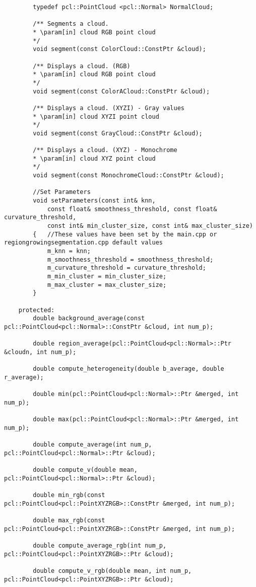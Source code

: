 \begin{lstlisting}
		typedef pcl::PointCloud <pcl::Normal> NormalCloud;

		/** Segments a cloud.
		* \param[in] cloud RGB point cloud
		*/
		void segment(const ColorCloud::ConstPtr &cloud);

		/** Displays a cloud. (RGB)
		* \param[in] cloud RGB point cloud
		*/
		void segment(const ColorACloud::ConstPtr &cloud);

		/** Displays a cloud. (XYZI) - Gray values
		* \param[in] cloud XYZI point cloud
		*/
		void segment(const GrayCloud::ConstPtr &cloud);

		/** Displays a cloud. (XYZ) - Monochrome
		* \param[in] cloud XYZ point cloud
		*/
		void segment(const MonochromeCloud::ConstPtr &cloud);

		//Set Parameters
		void setParameters(const int& knn,
			const float& smoothness_threshold, const float& curvature_threshold,
			const int& min_cluster_size, const int& max_cluster_size)
		{	//These values have been set by the main.cpp or regiongrowingsegmentation.cpp default values
			m_knn = knn;
			m_smoothness_threshold = smoothness_threshold;
			m_curvature_threshold = curvature_threshold;
			m_min_cluster = min_cluster_size;
			m_max_cluster = max_cluster_size;
		}

	protected:
		double background_average(const pcl::PointCloud<pcl::Normal>::ConstPtr &cloud, int num_p);

		double region_average(pcl::PointCloud<pcl::Normal>::Ptr &cloudn, int num_p);

		double compute_heterogeneity(double b_average, double r_average);

		double min(pcl::PointCloud<pcl::Normal>::Ptr &merged, int num_p);

		double max(pcl::PointCloud<pcl::Normal>::Ptr &merged, int num_p);

		double compute_average(int num_p, pcl::PointCloud<pcl::Normal>::Ptr &cloud);

		double compute_v(double mean, pcl::PointCloud<pcl::Normal>::Ptr &cloud);

		double min_rgb(const pcl::PointCloud<pcl::PointXYZRGB>::ConstPtr &merged, int num_p);

		double max_rgb(const pcl::PointCloud<pcl::PointXYZRGB>::ConstPtr &merged, int num_p);

		double compute_average_rgb(int num_p, pcl::PointCloud<pcl::PointXYZRGB>::Ptr &cloud);

		double compute_v_rgb(double mean, int num_p, pcl::PointCloud<pcl::PointXYZRGB>::Ptr &cloud);


\end{lstlisting}
